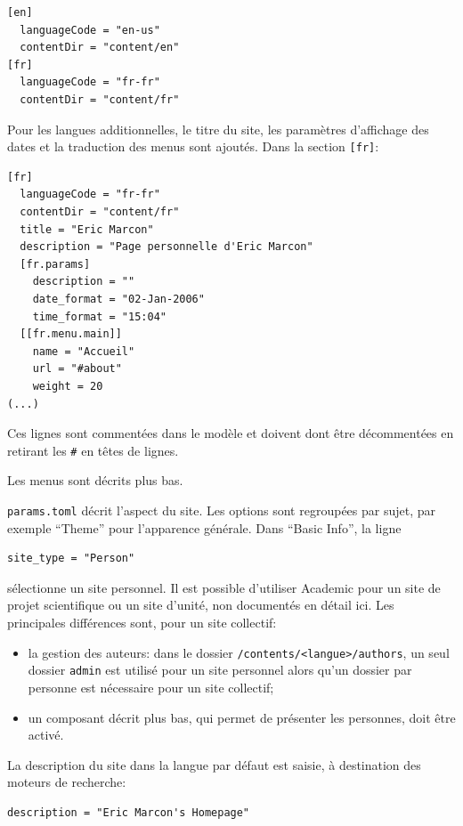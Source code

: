 \documentclass[
  12pt,
  french,
  a4paper,
  extrafontsizes,onecolumn,openright
  ]{memoir}
\providecommand{\tightlist}{%
  \setlength{\itemsep}{0pt}\setlength{\parskip}{0pt}}
\begin{document}
\begin{verbatim}
[en]
  languageCode = "en-us"
  contentDir = "content/en"
[fr]
  languageCode = "fr-fr"
  contentDir = "content/fr"
\end{verbatim}

Pour les langues additionnelles, le titre du site, les paramètres d'affichage des dates et la traduction des menus sont ajoutés.
Dans la section \texttt{{[}fr{]}}:

\begin{verbatim}
[fr]
  languageCode = "fr-fr"
  contentDir = "content/fr"
  title = "Eric Marcon"
  description = "Page personnelle d'Eric Marcon"
  [fr.params]
    description = ""
    date_format = "02-Jan-2006"
    time_format = "15:04"
  [[fr.menu.main]]
    name = "Accueil"
    url = "#about"
    weight = 20
(...)
\end{verbatim}

Ces lignes sont commentées dans le modèle et doivent dont être décommentées en retirant les \texttt{\#} en têtes de lignes.

Les menus sont décrits plus bas.

\texttt{params.toml} décrit l'aspect du site.
Les options sont regroupées par sujet, par exemple \enquote{Theme} pour l'apparence générale.
Dans \enquote{Basic Info}, la ligne

\begin{verbatim}
site_type = "Person"
\end{verbatim}

sélectionne un site personnel.
Il est possible d'utiliser Academic pour un site de projet scientifique ou un site d'unité, non documentés en détail ici.
Les principales différences sont, pour un site collectif:

\begin{itemize}
\tightlist
\item
  la gestion des auteurs: dans le dossier \texttt{/contents/\textless{}langue\textgreater{}/authors}, un seul dossier \texttt{admin} est utilisé pour un site personnel alors qu'un dossier par personne est nécessaire pour un site collectif;
\item
  un composant décrit plus bas, qui permet de présenter les personnes, doit être activé.
\end{itemize}

La description du site dans la langue par défaut est saisie, à destination des moteurs de recherche:

\begin{verbatim}
description = "Eric Marcon's Homepage"
\end{verbatim}
\end{document}
